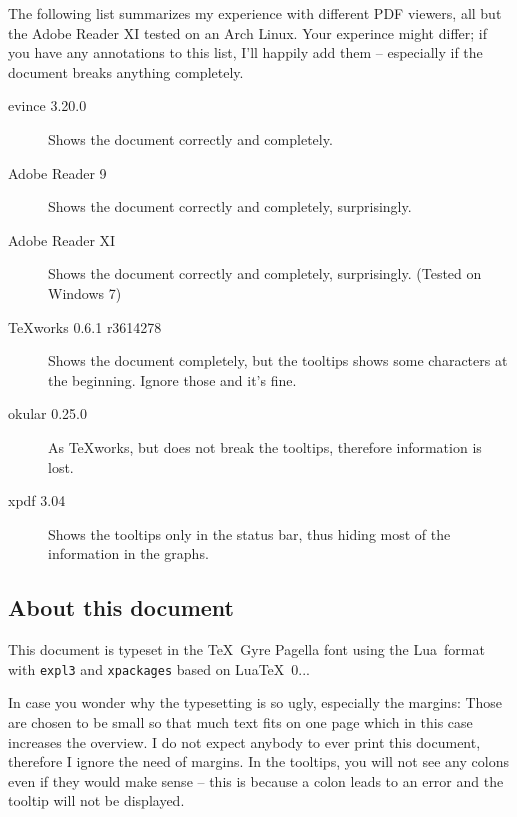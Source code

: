 The following list summarizes my experience with different PDF viewers, all but the Adobe Reader XI tested on an Arch Linux. Your experince might differ; if you have any annotations to this list, I'll happily add them – especially if the document breaks anything completely.

\begin{description}
\item[evince 3.20.0] Shows the document correctly and completely.

\item[Adobe Reader 9] Shows the document correctly and completely, surprisingly.

\item[Adobe Reader XI] Shows the document correctly and completely, surprisingly. (Tested on Windows 7)

\item[\TeX works 0.6.1 r3614278] Shows the document completely, but the tooltips shows some characters at the beginning. Ignore those and it's fine.

\item[okular 0.25.0] As \TeX works, but does not break the tooltips, therefore information is lost.

\item[xpdf 3.04] Shows the tooltips only in the status bar, thus hiding most of the information in the graphs.

\end{description}

\subsection*{About this document}
This document is typeset in the \TeX\ Gyre Pagella font using the Lua\LaTeXe\ format with \verb|expl3| and \verb|xpackages| based on Lua\TeX\ 0.\the\luatexversion.\luatexrevision.

In case you wonder why the typesetting is so ugly, especially the margins: Those are chosen to be small so that much text fits on one page which in this case increases the overview. I do not expect anybody to ever print this document, therefore I ignore the need of margins. In the tooltips, you will not see any colons even if they would make sense – this is because a colon leads to an error and the tooltip will not be displayed.


